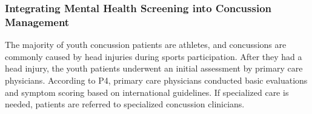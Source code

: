 \subsubsection{Integrating Mental Health Screening into Concussion Management}
\label{sec:formative-findings-f1}

The majority of youth concussion patients are athletes, and concussions are commonly caused by head injuries during sports participation.
After they had a head injury, the youth patients underwent an initial assessment by primary care physicians.
According to P4, primary care physicians conducted basic evaluations and symptom scoring based on international guidelines. 
If specialized care is needed, patients are referred to specialized concussion clinicians.

